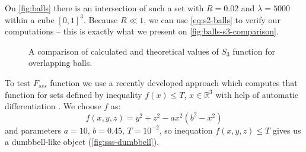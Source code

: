 \documentclass[reprint,amsmath,amssymb,aps,pre,showkeys,showpacs]{revtex4-1}
\begin{document}
On \cref{fig:balls} there is an intersection of such a set with $R = 0.02$ and
$\lambda=5000$ within a cube $[0, 1]^3$. Because $R \ll 1$, we can use
\cref{eq:s2-balls} to verify our computations -- this is exactly what we present on
\cref{fig:balls-s3-comparison}.
\begin{figure}[tp]
  \centering
  \hfill
  \caption[]{A comparison of calculated and theoretical values of $S_3$ function
    for overlapping balls.}
  \label{fig:s3-verification}
\end{figure}

To test $F_{sss}$ function we use a recently developed approach which computes
that function for sets defined by inequality $f(x) \le T$, $x \in \mathbb{R}^3$
with help of automatic differentiation \cite{postnicov20232}. We choose $f$ as:
\begin{equation}
  f(x, y, z) = y^2 + z^2 - a x^2 (b^2 - x^2)
\end{equation}
and parameters $a = 10$, $b = 0.45$, $T = 10^{-2}$, so inequation
$f(x, y, z) \le T$ gives us a dumbbell-like object (\cref{fig:sss-dumbbell}).
\end{document}
